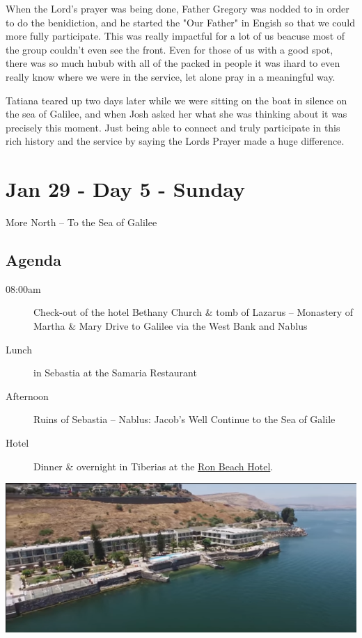 \documentclass[letterpaper]{report}
\begin{document}
When the Lord's prayer was being done, Father Gregory was nodded to in order to do the benidiction,
and he started the "Our Father" in Engish
so that we could more fully participate.
This was really impactful for a lot of us beacuse most of the group couldn't even see the front.
Even for those of us with a good spot,
there was so much hubub with all of the packed in people it was
ihard to even really know where we were in the service,
let alone pray in a meaningful way.

Tatiana teared up two days later while we
were sitting on the boat in silence on the sea of Galilee,
and when Josh asked her what she was thinking about it was precisely this moment.
Just being able to connect and truly participate in this rich history and the service by saying the Lords Prayer made a huge difference.

\clearpage
\section{Jan 29 - Day 5 - Sunday}
More North -- To the Sea of Galilee
\subsection{Agenda}
\begin{description}
	\item[08:00am] Check-out of the hotel Bethany
	  \subitem Church \& tomb of Lazarus – Monastery of Martha \& Mary
	  \subitem Drive to Galilee via the West Bank and Nablus
	\item[Lunch] in Sebastia at the Samaria Restaurant
	\item[Afternoon] Ruins of Sebastia – Nablus: Jacob’s Well
	  \subitem Continue to the Sea of Galile
	\item[Hotel] Dinner \& overnight in Tiberias at the
	  \href{http://www.ronbeachhotel.com/}{Ron Beach Hotel}.
\end{description}

\includegraphics[width=\textwidth]{RonBeachHotel}
\end{document}
